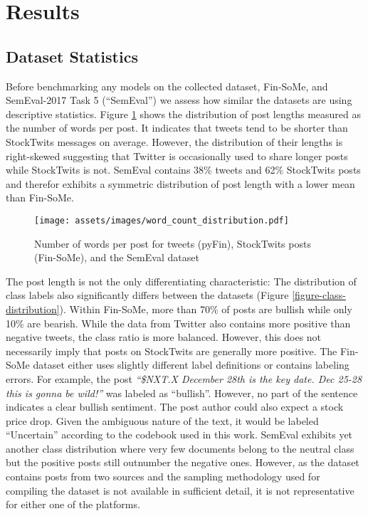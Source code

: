 \section{Results}

\subsection{Dataset Statistics}
\label{section-dataset-diffs}
Before benchmarking any models on the collected dataset, Fin-SoMe, and SemEval-2017 Task 5 (``SemEval'') \cite{cortis2017semeval} we assess how similar the datasets are using descriptive statistics. Figure \ref{figure-word-counts} shows the distribution of post lengths measured as the number of words per post. It indicates that tweets tend to be shorter than StockTwits messages on average. However, the distribution of their lengths is right-skewed suggesting that Twitter is occasionally used to share longer posts while StockTwits is not. SemEval contains 38\% tweets and 62\% StockTwits posts and therefor exhibits a symmetric distribution of post length with a lower mean than Fin-SoMe.


\begin{figure}[!ht]
	\texttt{[image: assets/images/word\_count\_distribution.pdf]}
	\caption{Number of words per post for tweets (pyFin), StockTwits posts (Fin-SoMe), and the SemEval dataset}
	\label{figure-word-counts}
\end{figure}

The post length is not the only differentiating characteristic: The distribution of class labels also significantly differs between the datasets (Figure \ref{figure-class-distribution}). Within Fin-SoMe, more than 70\% of posts are bullish while only 10\% are bearish. While the data from Twitter also contains more positive than negative tweets, the class ratio is more balanced. However, this does not necessarily imply that posts on StockTwits are generally more positive. The Fin-SoMe dataset either uses slightly different label definitions or contains labeling errors. For example, the post \emph{``\$NXT.X December 28th is the key date. Dec 25-28 this is gonna be wild!''} was labeled as ``bullish''. However, no part of the sentence indicates a clear bullish sentiment. The post author could also expect a stock price drop. Given the ambiguous nature of the text, it would be labeled ``Uncertain'' according to the codebook used in this work. SemEval exhibits yet another class distribution where very few documents belong to the neutral class but the positive posts still outnumber the negative ones. However, as the dataset contains posts from two sources and the sampling methodology used for compiling the dataset is not available in sufficient detail, it is not representative for either one of the platforms.

